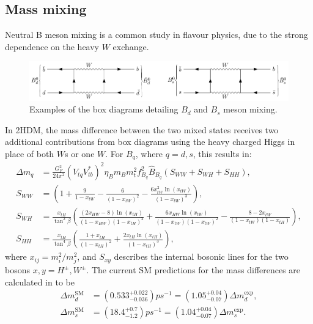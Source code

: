 \documentclass[a4paper,12pt]{article}
\begin{document}
\subsection{Mass mixing}
\label{subsec:mix}
Neutral B meson mixing is a common study in flavour physics, due to the strong dependence on the heavy $W$ exchange. 
\begin{figure}[H]
    \centering
    \includegraphics[width=\textwidth]{bmix.pdf}
    \caption{\label{fig:bmix} Examples of the box diagrams detailing $B_d$ and $B_s$ meson mixing.}
\end{figure}
In 2HDM, the mass difference between the two mixed states receives two additional contributions from box diagrams using the heavy charged Higgs in place of both $W$s or one $W$. 
For $B_q$, where $q=d,s$, this results in:
\begin{align}
    \Delta m_q &= \frac{G_F^2}{24\pi^2}(V_{tq}V_{tb}^*)^2\eta_Bm_Bm_t^2f_{B_q}^2\hat{B}_{B_q}(S_{WW}+S_{WH}+S_{HH}), \\
    S_{WW} &= \left(1+\frac{9}{1-x_{tW}}-\frac{6}{(1-x_{tW})^2}-\frac{6x_{tW}^2\ln(x_{tW})}{(1-x_{tW})^3}\right), \\
    S_{WH} &= \frac{x_{tH}}{\tan^2\beta}\left(\frac{(2x_{HW}-8)\ln(x_{tH})}{(1-x_{HW})(1-x_{tH})^2}+\frac{6x_{HW}\ln(x_{tW})}{(1-x_{tW})(1-x_{tW})^2}-\frac{8-2x_{tW}}{(1-x_{tW})(1-x_{tH})}\right),\\
    S_{HH} &= \frac{x_{tH}}{\tan^4\beta}\left(\frac{1+x_{tH}}{(1-x_{tH})^2}+\frac{2x_{tH}\ln(x_{tH})}{(1-x_{tH})^3}\right),
\end{align}
where $x_{ij} = m_i^2/m_j^2$, and $S_{xy}$ describes the internal bosonic lines for the two bosons $x,y = H^\pm,W^\pm$.
The current SM predictions for the mass differences are calculated in \cite{i} to be
\begin{align}
    \Delta m^{\text{SM}}_d &= \left(0.533^{+0.022}_{-0.036}\right)ps^{-1} = \left(1.05^{+0.04}_{-0.07}\right)\Delta m_d^{\text{exp}}, \\
    \Delta m^{\text{SM}}_s &= \left(18.4^{+0.7}_{-1.2}\right)ps^{-1} = \left(1.04^{+0.04}_{-0.07}\right)\Delta m_s^{\text{exp}}.
\end{align}
\end{document}
